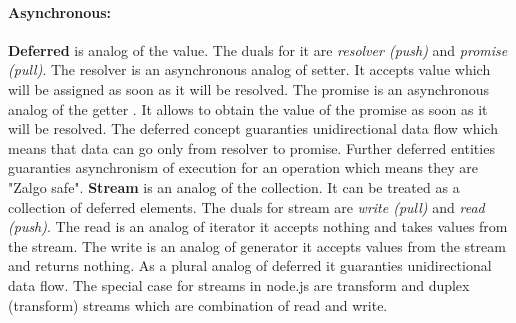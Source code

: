 \paragraph{Asynchronous:} \textbf{Deferred} is analog of the value. The duals for it are \textit{resolver (push)} and \textit{promise (pull)}. The resolver is an asynchronous analog of setter. It  accepts value which will be assigned as soon as it will be resolved. The promise is an asynchronous analog of the getter . It allows to obtain the value of the promise as soon as it will be resolved. The deferred concept guaranties unidirectional data flow which means that data can go only from resolver to promise. Further deferred entities guaranties asynchronism of execution for an operation which means they are "Zalgo safe"\cite{asyncPerformance}. \textbf{Stream} is an analog of the collection. It can be treated as a collection of deferred elements. The duals for stream are \textit{write (pull)} and \textit{read (push)}. The read is an analog of iterator it accepts nothing and takes values from the stream. The write is an analog of generator it accepts values from the stream and returns nothing. As a plural analog of deferred it guaranties unidirectional data flow.  The special case for streams in node.js are transform and duplex (transform) streams which are combination of read and write.







